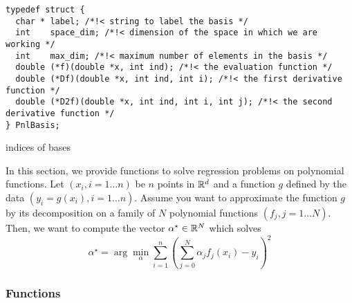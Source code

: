 \begin{verbatim}
typedef struct {
  char * label; /*!< string to label the basis */
  int    space_dim; /*!< dimension of the space in which we are working */
  int    max_dim; /*!< maximum number of elements in the basis */
  double (*f)(double *x, int ind); /*!< the evaluation function */
  double (*Df)(double *x, int ind, int i); /*!< the first derivative function */
  double (*D2f)(double *x, int ind, int i, int j); /*!< the second derivative function */
} PnlBasis;
\end{verbatim}

\begin{table}[h!]
  \begin{describeconst}
  \end{describeconst}
  \caption{indices of bases}
  \label{basis_index}
\end{table}

In this section, we provide functions to solve regression problems on
polynomial functions. Let $(x_i, i=1 \dots n)$ be $n$ points in ${\mathbb R}^d$ and a
function $g$ defined by the data $(y_i = g(x_i), i=1 \dots n)$. Assume you
want to approximate the function $g$ by its decomposition on a family of $N$
polynomial functions $(f_j, j=1\dots N)$. Then, we want to compute the vector
$\alpha^\star \in {\mathbb R}^N$ which solves
\begin{equation*} \alpha^\star = \arg\min_\alpha \sum_{i=1}^{n}
  \left(\sum_{j=0}^N \alpha_j f_j(x_i) - y_i\right)^2
\end{equation*}

\subsubsection{Functions}

